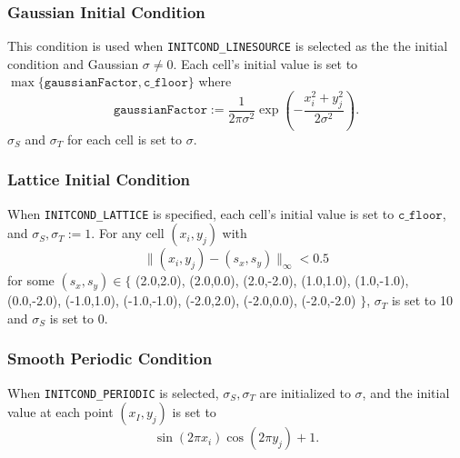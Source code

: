 \documentclass{article}
\newcommand{\floor}{\ensuremath{\mathtt{c\_floor}}\xspace}
\newcommand{\assign}{\ensuremath{\mathrel{\texttt{:=}}}}
\begin{document}
\subsubsection{Gaussian Initial Condition}
\label{init:gauss}
This condition is used when \texttt{INITCOND\_LINESOURCE} is selected as the the
initial condition and Gaussian $\sigma \neq 0$. Each cell's initial value is
set to $\max \{\texttt{gaussianFactor}, \floor\}$ where
\begin{equation}
    \mathtt{gaussianFactor} \assign \frac{1}{2\pi\sigma^2}
        \exp \left(- \frac{x_i^2 + y_j^2}{2\sigma^2}\right).
\end{equation}
$\sigma_S$ and $\sigma_T$ for each cell is set to $\sigma$.

\subsubsection{Lattice Initial Condition}
\label{init:lattice}
When \texttt{INITCOND\_LATTICE} is specified, each cell's initial value is set to
\floor, and $\sigma_S,\sigma_T \assign 1$. For any cell $(x_i,y_j)$ with
\begin{equation}
    \|(x_i,y_j) - (s_x, s_y)\|_\infty < 0.5
\end{equation}    
for some $(s_x,s_y) \in \{$
    (2.0,2.0), (2.0,0.0), (2.0,-2.0), (1.0,1.0), (1.0,-1.0),
    (0.0,-2.0), (-1.0,1.0), (-1.0,-1.0), (-2.0,2.0), (-2.0,0.0), (-2.0,-2.0)
$\}$, $\sigma_T$ is set to 10 and $\sigma_S$ is set to 0.

\subsubsection{Smooth Periodic Condition}
\label{init:smooth}
When \texttt{INITCOND\_PERIODIC} is selected, $\sigma_S, \sigma_T$ are initialized
to $\sigma$, and the initial value at each point $(x_I,y_j)$ is set to
\begin{equation}
    \sin(2\pi x_i) \cos(2\pi y_j) + 1.
\end{equation}
\end{document}
